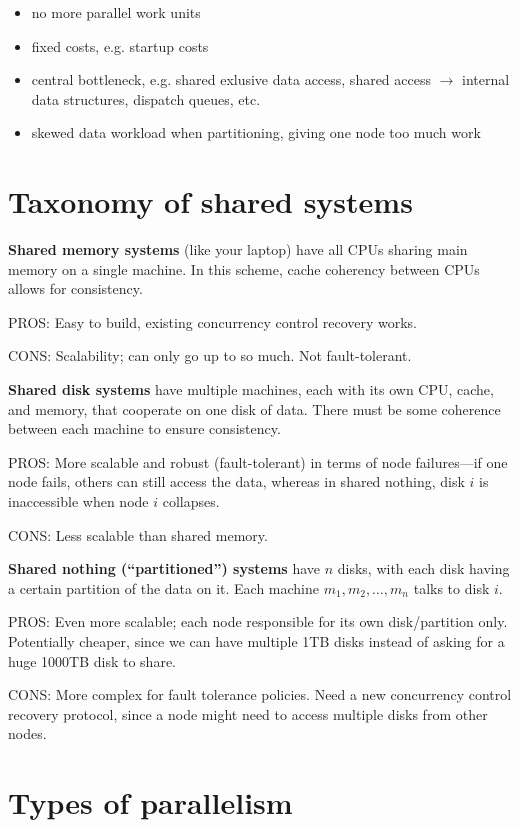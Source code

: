 \documentclass{article}
\begin{document}
\begin{itemize}
    \item no more parallel work units
    \item fixed costs, e.g. startup costs
    \item central bottleneck, e.g. shared exlusive data access, shared access $\rightarrow$ internal data structures, dispatch queues, etc.
    \item skewed data workload when partitioning, giving one node too much work
\end{itemize}

\section{Taxonomy of shared systems}

\textbf{Shared memory systems} (like your laptop) have all CPUs sharing main memory on a single machine. In this scheme, cache coherency between CPUs allows for consistency.

PROS: Easy to build, existing concurrency control recovery works.

CONS: Scalability; can only go up to so much. Not fault-tolerant.

\textbf{Shared disk systems} have multiple machines, each with its own CPU, cache, and memory, that cooperate on one disk of data. There must be some coherence between each machine to ensure consistency.

PROS: More scalable and robust (fault-tolerant) in terms of node failures---if one node fails, others can still access the data, whereas in shared nothing, disk $i$ is inaccessible when node $i$ collapses.

CONS: Less scalable than shared memory.

\textbf{Shared nothing (``partitioned'') systems} have $n$ disks, with each disk having a certain partition of the data on it. Each machine $m_1,m_2,\ldots,m_n$ talks to disk $i$.

PROS: Even more scalable; each node responsible for its own disk/partition only. Potentially cheaper, since we can have multiple 1TB disks instead of asking for a huge 1000TB disk to share.

CONS: More complex for fault tolerance policies. Need a new concurrency control recovery protocol, since a node might need to access multiple disks from other nodes.

\section{Types of parallelism}
\end{document}
